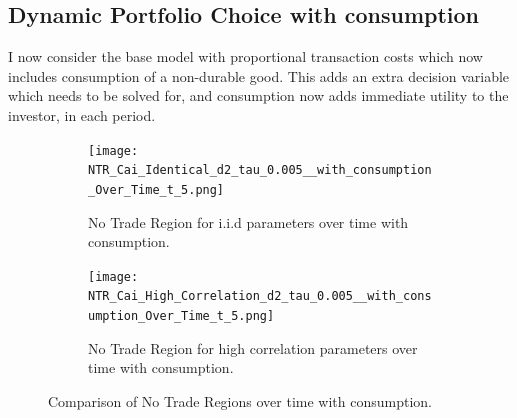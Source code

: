 \documentclass[11pt]{article}
\begin{document}
\subsection{Dynamic Portfolio Choice with consumption} \label{Subsection: Results_WithConsumption}
I now consider the base model with proportional transaction costs which now includes consumption of a non-durable good.
This adds an extra decision variable which needs to be solved for, and consumption now adds immediate utility to the investor, in each period.
\begin{figure}[!ht]
    \centering
    \begin{subfigure}[t]{0.48\textwidth}
        \centering
        \texttt{[image: NTR\_Cai\_Identical\_d2\_tau\_0.005\_\_with\_consumption\_Over\_Time\_t\_5.png]}
        \caption{No Trade Region for i.i.d parameters over time with consumption.}
        \label{fig:NTR_2d_iid_with_consumption_over_time}
    \end{subfigure}%
    \hfill
    \begin{subfigure}[t]{0.48\textwidth}
        \centering
        \texttt{[image: NTR\_Cai\_High\_Correlation\_d2\_tau\_0.005\_\_with\_consumption\_Over\_Time\_t\_5.png]}
        \caption{No Trade Region for high correlation parameters over time with consumption.}
        \label{fig:NTR_2d_high_correlation_with_consumption_over_time}
    \end{subfigure}
    \caption{Comparison of No Trade Regions over time with consumption.}
\end{figure}
\end{document}
